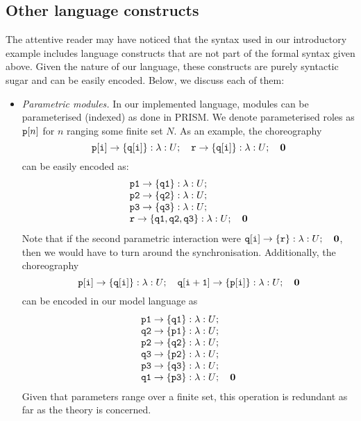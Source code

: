\subsection{Other language constructs}
%
The attentive reader may have noticed that the syntax used in our
introductory example includes language constructs that are not part of
the formal syntax given above. Given the nature of our language, these
constructs are purely syntactic sugar and can be easily
encoded. Below, we discuss each of them:
% 
\begin{itemize}

\item {\em Parametric modules.} In our implemented language, modules
  can be parameterised (indexed) as done in PRISM. We denote
  parameterised roles as $\mathtt{p}[n]$ for $n$ ranging some finite set
  $N$.
  As an example, the choreography
  \[\mathtt{p[i]}\rightarrow \{\mathtt{q[i]}\}:\lambda:U;\quad 
    \mathtt{r}\rightarrow \{\mathtt{q[i]}\}:\lambda:U;\quad \mathbf{0}
  \]
  can be easily encoded as:
  \[
    \begin{array}{llll}
      \mathtt{p1}\rightarrow \{\mathtt{q1}\}:\lambda:U;\quad \\
      \mathtt{p2}\rightarrow \{\mathtt{q2}\}:\lambda:U;\quad \\
      \mathtt{p3}\rightarrow \{\mathtt{q3}\}:\lambda:U;\quad \\
      \mathtt{r}\rightarrow \{\mathtt{q1,q2,q3}\}:\lambda:U;\quad \mathbf{0}
    \end{array}
  \]
  Note that if the second parametric interaction were
  $\mathtt{q[i]}\rightarrow \{\mathtt{r}\}:\lambda:U;\quad \mathbf{0}$, then we would have to
  turn around the synchronisation. 
  Additionally, the choreography
  \[\mathtt{p[i]}\rightarrow \{\mathtt{q[i]}\}:\lambda:U;\quad 
    \mathtt{q[i+1]}\rightarrow \{\mathtt{p[i]}\}:\lambda:U;\quad \mathbf{0}
  \]
  can be encoded in our model language as
  \[
    \begin{array}{llll}
      \mathtt{p1}\rightarrow \{\mathtt{q1}\}:\lambda:U;\quad \\
      \mathtt{q2}\rightarrow \{\mathtt{p1}\}:\lambda:U;\quad \\
      \mathtt{p2}\rightarrow \{\mathtt{q2}\}:\lambda:U;\quad \\
      \mathtt{q3}\rightarrow \{\mathtt{p2}\}:\lambda:U;\quad \\
      \mathtt{p3}\rightarrow \{\mathtt{q3}\}:\lambda:U;\quad \\
      \mathtt{q1}\rightarrow \{\mathtt{p3}\}:\lambda:U;\quad  \mathbf{0}
    \end{array}
  \]
  Given that parameters range over a finite set, this operation is
  redundant as far as the theory is concerned.


\end{itemize}
